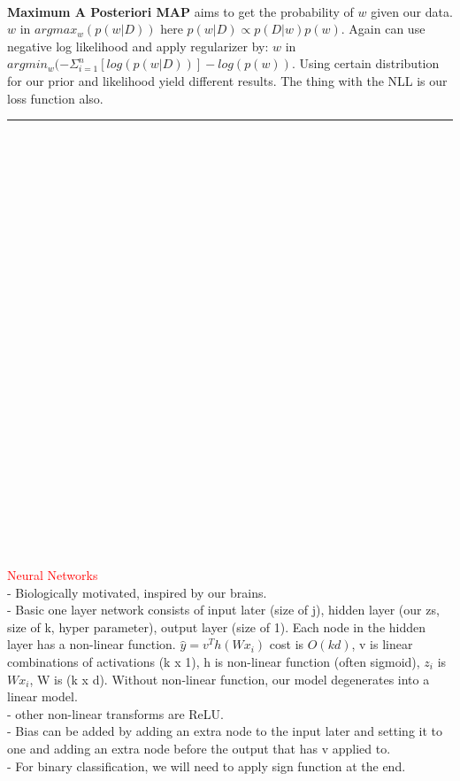 \documentclass[8pt]{extarticle}
\begin{document}
\begin{multicols*}{2}
\\
\textbf{Maximum A Posteriori MAP} aims to get the probability of $w$ given our data. $w$ in  $argmax_w(p(w|D))$ here $p(w|D) \propto p(D|w)p(w)$. Again can use negative log likelihood and apply regularizer by: $w$ in  $argmin_w(-\Sigma_{i=1}^n[log(p(w|D))] - log(p(w))$. Using certain distribution for our prior and likelihood yield different results. The thing with the NLL is our loss function also.
\\
\rule{\linewidth}{0.5mm} 
\\\\\\\\\\\\\\\\\\\\\\\\\\\\\\\\\\\\\\\\\\\\\\\\\\
\textcolor{red}{Neural Networks}
\\
- Biologically motivated, inspired by our brains.
\\
- Basic one layer network consists of input later (size of j), hidden layer (our zs, size of k, hyper parameter), output layer (size of 1). Each node in the hidden layer has a non-linear function. $\hat{y}=v^Th(Wx_i)$ cost is $O(kd)$, v is linear combinations of activations (k x 1), h is non-linear function (often sigmoid),  $z_i$ is $Wx_i$, W is (k x d). Without non-linear function, our model degenerates into a linear model.
\\
- other non-linear transforms are ReLU.
\\
- Bias can be added by adding an extra node to the input later and setting it to one and adding an extra node before the output that has v applied to.
\\
- For binary classification, we will need to apply sign function at the end.
\\

\end{multicols*}
\end{document}
